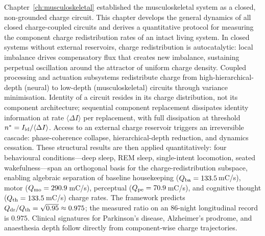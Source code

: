 \begin{chapterabstract}
Chapter~\ref{ch:musculoskeletal} established the musculoskeletal system as a
closed, non-grounded charge circuit.  This chapter develops the general
dynamics of all closed charge-coupled circuits and derives a quantitative
protocol for measuring the component charge redistribution rates of an intact
living system.  In closed systems without external reservoirs, charge
redistribution is autocatalytic: local imbalance drives compensatory flux that
creates new imbalance, sustaining perpetual oscillation around the attractor
of uniform charge density.  Coupled processing and actuation subsystems
redistribute charge from high-hierarchical-depth (neural) to low-depth
(musculoskeletal) circuits through variance minimisation.  Identity of a
circuit resides in its charge distribution, not its component architecture;
sequential component replacement dissipates identity information at rate
$\langle\Delta I\rangle$ per replacement, with full dissipation at threshold
$n^* = I_{\mathrm{id}}/\langle\Delta I\rangle$.  Access to an external charge reservoir
triggers an irreversible cascade: phase-coherence collapse, hierarchical-depth
reduction, and dynamics cessation.  These structural results are then applied
quantitatively: four behavioural conditions---deep sleep, REM sleep,
single-intent locomotion, seated wakefulness---span an orthogonal basis for
the charge-redistribution subspace, enabling algebraic separation of baseline
housekeeping ($Q_{\mathrm{ba}} = 133.5$\,mC/s), motor ($Q_{\mathrm{mo}} = 290.9$\,mC/s),
perceptual ($Q_{\mathrm{pe}} = 70.9$\,mC/s), and cognitive thought ($Q_{\mathrm{th}} = 133.5$\,mC/s)
charge rates.  The framework predicts $Q_{\mathrm{dr}}/Q_{\mathrm{th}} = \sqrt{0.95} \approx 0.975$;
the measured ratio on an 86-night longitudinal record is $0.975$.  Clinical
signatures for Parkinson's disease, Alzheimer's prodrome, and anaesthesia
depth follow directly from component-wise charge trajectories.
\end{chapterabstract}

